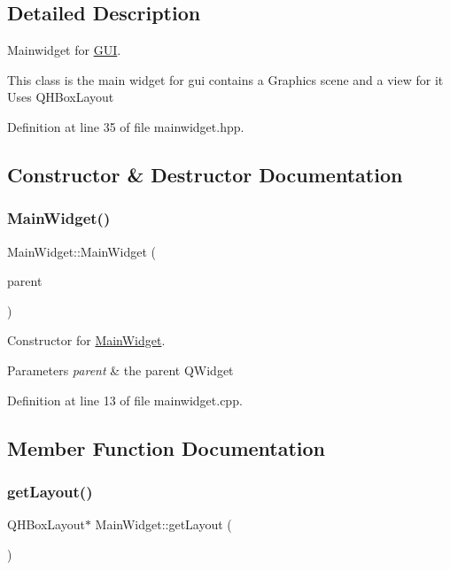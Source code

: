 \subsection{Detailed Description}
Mainwidget for \mbox{\hyperlink{classGUI}{G\+UI}}. 

This class is the main widget for gui contains a Graphics scene and a view for it Uses Q\+H\+Box\+Layout 

Definition at line 35 of file mainwidget.\+hpp.



\subsection{Constructor \& Destructor Documentation}
\mbox{\label{classMainWidget_a62f5aa5fe2314c6221ac49b328b72e8b}} 
\subsubsection{\texorpdfstring{Main\+Widget()}{MainWidget()}}
{\footnotesize\ttfamily Main\+Widget\+::\+Main\+Widget (\begin{DoxyParamCaption}\item[{Q\+Widget $\ast$}]{parent }\end{DoxyParamCaption})}



Constructor for \mbox{\hyperlink{classMainWidget}{Main\+Widget}}. 


\begin{DoxyParams}{Parameters}
{\em parent} & the parent Q\+Widget \\
\hline
\end{DoxyParams}


Definition at line 13 of file mainwidget.\+cpp.



\subsection{Member Function Documentation}
\mbox{\label{classMainWidget_a639b465bb49eb31e1c09051ae047951f}} 
\subsubsection{\texorpdfstring{get\+Layout()}{getLayout()}}
{\footnotesize\ttfamily Q\+H\+Box\+Layout$\ast$ Main\+Widget\+::get\+Layout (\begin{DoxyParamCaption}{ }\end{DoxyParamCaption})\hspace{0.3cm}{\ttfamily [inline]}}




